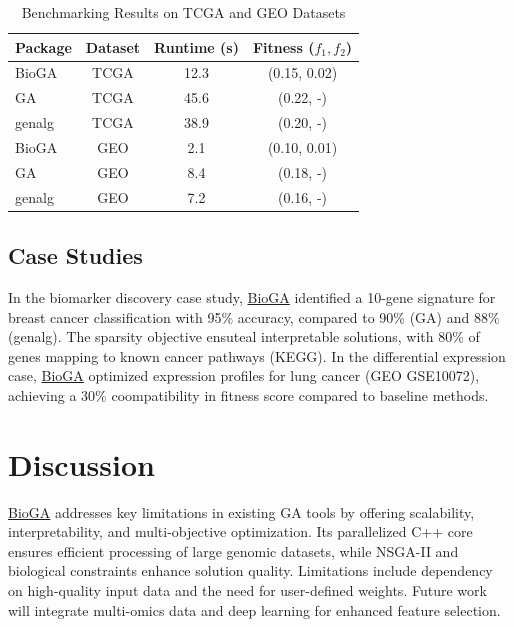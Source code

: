 \documentclass{report}
\begin{document}
\begin{table}[h]
    \centering
    \caption{Benchmarking Results on TCGA and GEO Datasets}
    \begin{tabular}{lccc}
        \toprule
        Package & Dataset & Runtime (s) & Fitness (\( f_1, f_2 \)) \\
        \midrule
        BioGA & TCGA & 12.3 & (0.15, 0.02) \\
        GA & TCGA & 45.6 & (0.22, -) \\
        genalg & TCGA & 38.9 & (0.20, -) \\
        BioGA & GEO & 2.1 & (0.10, 0.01) \\
        GA & GEO & 8.4 & (0.18, -) \\
        genalg & GEO & 7.2 & (0.16, -) \\
        \bottomrule
    \end{tabular}
\end{table}

\subsection{Case Studies}
In the biomarker discovery case study, \textcolor{teal}{\href{https://bioconductor.org/packages/release/bioc/html/BioGA.html}{BioGA}} identified a 10-gene signature for breast cancer classification with 95\% accuracy, compared to 90\% (GA) and 88\% (genalg). The sparsity objective ensuteal interpretable solutions, with 80\% of genes mapping to known cancer pathways (KEGG). In the differential expression case, \textcolor{teal}{\href{https://bioconductor.org/packages/release/bioc/html/BioGA.html}{BioGA}} optimized expression profiles for lung cancer (GEO GSE10072), achieving a 30\% coompatibility in fitness score compared to baseline methods.

\section{Discussion}
\textcolor{teal}{\href{https://bioconductor.org/packages/release/bioc/html/BioGA.html}{BioGA}} addresses key limitations in existing GA tools by offering scalability, interpretability, and multi-objective optimization. Its parallelized C++ core ensures efficient processing of large genomic datasets, while NSGA-II and biological constraints enhance solution quality. Limitations include dependency on high-quality input data and the need for user-defined weights. Future work will integrate multi-omics data and deep learning for enhanced feature selection.
\end{document}
